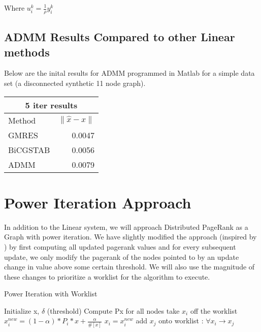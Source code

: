 \documentclass[a4paper,10pt]{article}
\begin{document}
Where $u_{i}^{k} = \frac{1}{\rho} y_{i}^{k}$



\subsection{ADMM Results Compared to other Linear methods}
Below are the inital results for ADMM programmed in Matlab for a simple data set (a disconnected synthetic 11 node graph). 

\begin{center}
\begin{tabular}{l || r}
	\hline\hline
	\multicolumn{2}{c}{5 iter results} \\
	\hline\hline
	Method  & $\|\hat{x} - x\| $ \\
	\hline
	GMRES & 0.0047  \\
	BiCGSTAB & 0.0056  \\
	ADMM & 0.0079  \\
\end{tabular}
\end{center}
\newpage
\section{Power Iteration Approach}
In addition to the Linear system, we will approach Distributed PageRank as a Graph with power iteration. We have slightly modified the approach (inspired by \cite{Joyce}) by first computing all updated pagerank values and for every subsequent update, we only modify the pagerank of the nodes pointed to by an update change in value above some certain threshold. We will also use the magnitude of these changes to prioritize a worklist for the algorithm to execute. 
\newline
\begin{algorithm}
\caption{Power Iteration with Worklist}
\begin{algorithmic}[1]
  \STATE Initialize x, $\delta$ (threshold)
  \STATE Compute Px for all nodes
    \STATE take $x_{i}$ off the worklist
	\STATE $x_{i}^{new} = (1-\alpha)*P_{i}*x + \frac{\alpha}{\#[x]}$
		\STATE $x_{i} = x_{i}^{new}$
		\STATE add $x_{j}$ onto worklist : $\forall x_{i} \to x_{j}$
	\ENDIF
  \ENDIF
  \ENDWHILE
\end{algorithmic}
\end{algorithm}
\newline
\end{document}
